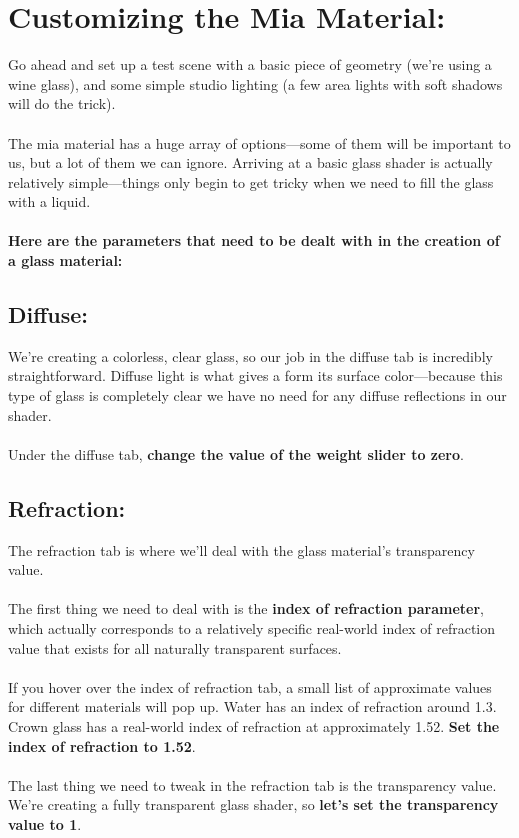\documentclass[10pt,a4paper]{article}
\begin{document}
\section{Customizing the Mia Material:}
Go ahead and set up a test scene with a basic piece of geometry (we're using a wine glass), and some simple studio lighting (a few area lights with soft shadows will do the trick).
\\
\\
The mia material has a huge array of options—some of them will be important to us, but a lot of them we can ignore. Arriving at a basic glass shader is actually relatively simple—things only begin to get tricky when we need to fill the glass with a liquid.
\\
\\
\textbf{Here are the parameters that need to be dealt with in the creation of a glass material:}
\subsection{Diffuse: }
We're creating a colorless, clear glass, so our job in the diffuse tab is incredibly straightforward. Diffuse light is what gives a form its surface color—because this type of glass is completely clear we have no need for any diffuse reflections in our shader.
\\
\\
Under the diffuse tab, \textbf{change the value of the weight slider to zero}.

\subsection{Refraction: }
The refraction tab is where we'll deal with the glass material’s transparency value.
\\
\\
The first thing we need to deal with is the \textbf{index of refraction parameter}, which actually corresponds to a relatively specific real-world index of refraction value that exists for all naturally transparent surfaces.
\\
\\
If you hover over the index of refraction tab, a small list of approximate values for different materials will pop up. Water has an index of refraction around 1.3. Crown glass has a real-world index of refraction at approximately 1.52. \textbf{Set the index of refraction to 1.52}.
\\
\\
The last thing we need to tweak in the refraction tab is the transparency value. We're creating a fully transparent glass shader, so \textbf{let's set the transparency value to 1}.
\end{document}
